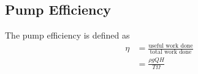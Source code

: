 \subsection{Pump Efficiency}
The pump efficiency is defined as
\begin{align}
    \eta &= \frac{\text{useful work done}}{\text{total work done}} \nonumber \\
    &= \frac{\rho g Q H}{T \Omega} \label{eq:pump_efficiency}
\end{align}